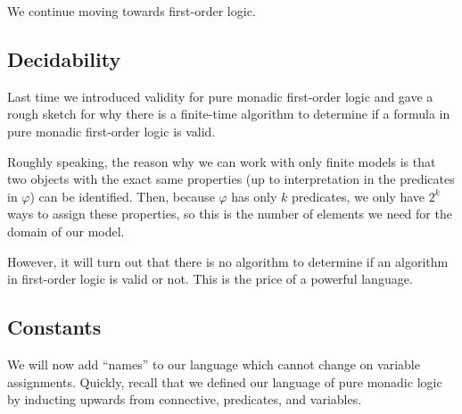 \documentclass[../notes.tex]{subfiles}
\begin{document}

We continue moving towards first-order logic.

\subsection{Decidability}
Last time we introduced validity for pure monadic first-order logic and gave a rough sketch for why there is a finite-time algorithm to determine if a formula in pure monadic first-order logic is valid.
\begin{remark}
	Roughly speaking, the reason why we can work with only finite models is that two objects with the exact same properties (up to interpretation in the predicates in $\varphi$) can be identified. Then, because $\varphi$ has only $k$ predicates, we only have $2^k$ ways to assign these properties, so this is the number of elements we need for the domain of our model.
\end{remark}
However, it will turn out that there is no algorithm to determine if an algorithm in first-order logic is valid or not. This is the price of a powerful language.

\subsection{Constants}
We will now add ``names'' to our language which cannot change on variable assignments. Quickly, recall that we defined our language of pure monadic logic by inducting upwards from connective, predicates, and variables.
\end{document}
